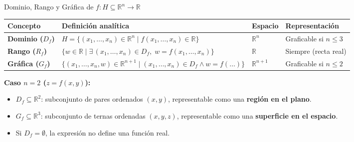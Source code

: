 \documentclass[aspectratio=169,10pt]{beamer}
\begin{document}
\begin{frame}{Dominio, Rango y Gráfica de $f : H \subseteq \mathbb{R}^n \to \mathbb{R}$}
  \begin{table}
    \centering
    \setlength{\tabcolsep}{3pt}
    \footnotesize
    \begin{tabular}{p{2.3cm} p{5.2cm} p{2.3cm} p{3.2cm}}
      \toprule
      \textbf{Concepto} & \textbf{Definición analítica} & \textbf{Espacio} & \textbf{Representación} \\
      \midrule
      \textbf{Dominio ($D_f$)} & $H = \{(x_1,\dots,x_n) \in \mathbb{R}^n \mid f(x_1,\dots,x_n) \in \mathbb{R}\}$ & $\mathbb{R}^n$ & Graficable si $n \le 3$ \\
      \addlinespace
      \textbf{Rango ($R_f$)} & $\{w \in \mathbb{R} \mid \exists\,(x_1,\dots,x_n) \in D_f,\; w = f(x_1,\dots,x_n)\}$ & $\mathbb{R}$ & Siempre (recta real) \\
      \addlinespace
      \textbf{Gráfica ($G_f$)} & $\{(x_1,\dots,x_n,w) \in \mathbb{R}^{n+1} \mid (x_1,\dots,x_n)\in D_f \wedge w = f(\dots)\}$ & $\mathbb{R}^{n+1}$ & Graficable si $n \le 2$ \\
      \bottomrule
    \end{tabular}
  \end{table}

  \vspace{0.3cm}
  \textbf{Caso $n=2$ ($z = f(x,y)$):}
  \begin{itemize}
    \item $D_f \subseteq \mathbb{R}^2$: subconjunto de pares ordenados $(x,y)$, representable como una \textbf{región en el plano}.
    \item $G_f \subseteq \mathbb{R}^3$: subconjunto de ternas ordenadas $(x,y,z)$, representable como una \textbf{superficie en el espacio}.
    \item Si $D_f = \emptyset$, la expresión no define una función real.
  \end{itemize}
\end{frame}
\end{document}
